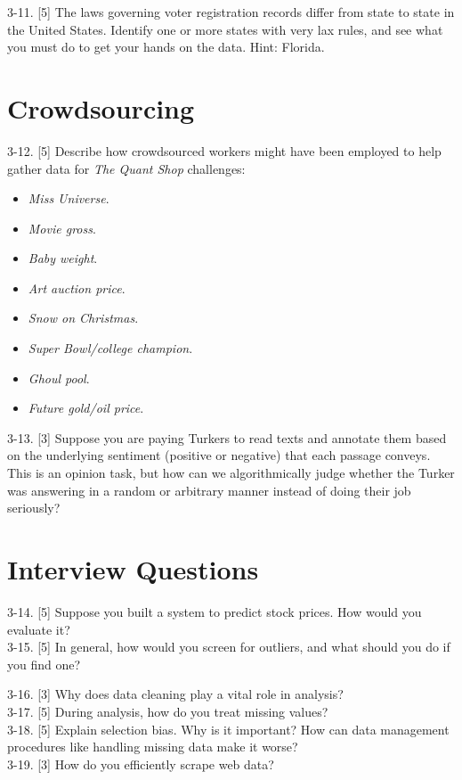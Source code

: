 \documentclass[10pt]{article}
\begin{document}
3-11. [5] The laws governing voter registration records differ from state to state in the United States. Identify one or more states with very lax rules, and see what you must do to get your hands on the data. Hint: Florida.

\section*{Crowdsourcing}
3-12. [5] Describe how crowdsourced workers might have been employed to help gather data for \textit{The Quant Shop} challenges:
\begin{itemize}
  \item \textit{Miss Universe}.
  \item \textit{Movie gross}.
  \item \textit{Baby weight}.
  \item \textit{Art auction price}.
  \item \textit{Snow on Christmas}.
  \item \textit{Super Bowl/college champion}.
  \item \textit{Ghoul pool}.
  \item \textit{Future gold/oil price}.
\end{itemize}

3-13. [3] Suppose you are paying Turkers to read texts and annotate them based on the underlying sentiment (positive or negative) that each passage conveys. This is an opinion task, but how can we algorithmically judge whether the Turker was answering in a random or arbitrary manner instead of doing their job seriously?

\section*{Interview Questions}
3-14. [5] Suppose you built a system to predict stock prices. How would you evaluate it?\\
3-15. [5] In general, how would you screen for outliers, and what should you do if you find one?

3-16. [3] Why does data cleaning play a vital role in analysis?\\
3-17. [5] During analysis, how do you treat missing values?\\
3-18. [5] Explain selection bias. Why is it important? How can data management procedures like handling missing data make it worse?\\
3-19. [3] How do you efficiently scrape web data?
\end{document}
